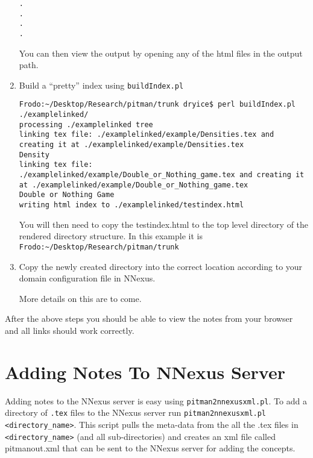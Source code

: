\documentclass[10pt]{article}
\begin{document}
\begin{enumerate}
\begin{verbatim}
.
.
.
.
\end{verbatim}

You can then view the output by opening any of the html files in the output path.


\item Build a ``pretty'' index using \verb#buildIndex.pl#

\begin{verbatim}
Frodo:~/Desktop/Research/pitman/trunk dryice$ perl buildIndex.pl ./examplelinked/
processing ./examplelinked tree
linking tex file: ./examplelinked/example/Densities.tex and creating it at ./examplelinked/example/Densities.tex
Density
linking tex file: ./examplelinked/example/Double_or_Nothing_game.tex and creating it at ./examplelinked/example/Double_or_Nothing_game.tex
Double or Nothing Game
writing html index to ./examplelinked/testindex.html
\end{verbatim}

You will then need to copy the testindex.html to the top level directory of the rendered directory structure. In this example it is 
\verb#Frodo:~/Desktop/Research/pitman/trunk#

\item Copy the newly created directory into the correct location according to your domain configuration file in NNexus.

More details on this are to come.
\end{enumerate}

After the above steps you should be able to view the notes from your browser and all links should work correctly.

\section{Adding Notes To NNexus Server}
Adding notes to the NNexus server is easy using \verb#pitman2nnexusxml.pl#.
To add a directory of \verb#.tex# files to the NNexus server run
\verb#pitman2nnexusxml.pl <directory_name>#. This script pulls the meta-data
from the all the .tex files in \verb#<directory_name># (and all sub-directories) and 
creates an xml file called pitmanout.xml that can be sent to the NNexus server for adding the
concepts.
\end{document}
